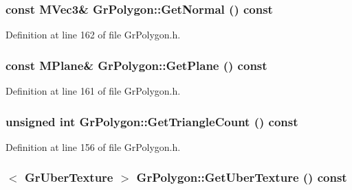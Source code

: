 \begin{CompactItemize}
{\subsubsection[{GetNormal}]{\setlength{\rightskip}{0pt plus 5cm}const {\bf MVec3}\& GrPolygon::GetNormal () const}}
\label{class_gr_polygon_36a40f8b1208bdcf5f39f1ff128bafc5}




Definition at line 162 of file GrPolygon.h.\hypertarget{class_gr_polygon_52de5745993a825a901f9fc39c7c0fe4}{
\subsubsection[{GetPlane}]{\setlength{\rightskip}{0pt plus 5cm}const {\bf MPlane}\& GrPolygon::GetPlane () const}}
\label{class_gr_polygon_52de5745993a825a901f9fc39c7c0fe4}




Definition at line 161 of file GrPolygon.h.\hypertarget{class_gr_polygon_18ae3ecb1015c722fb8379d8267b9464}{
\subsubsection[{GetTriangleCount}]{\setlength{\rightskip}{0pt plus 5cm}unsigned int GrPolygon::GetTriangleCount () const}}
\label{class_gr_polygon_18ae3ecb1015c722fb8379d8267b9464}




Definition at line 156 of file GrPolygon.h.\hypertarget{class_gr_polygon_7e2c3270815ee17025f222dc0c3be4ea}{
\subsubsection[{GetUberTexture}]{$<$ {\bf GrUberTexture} $>$ GrPolygon::GetUberTexture () const}}
\label{class_gr_polygon_7e2c3270815ee17025f222dc0c3be4ea}





\end{CompactItemize}
